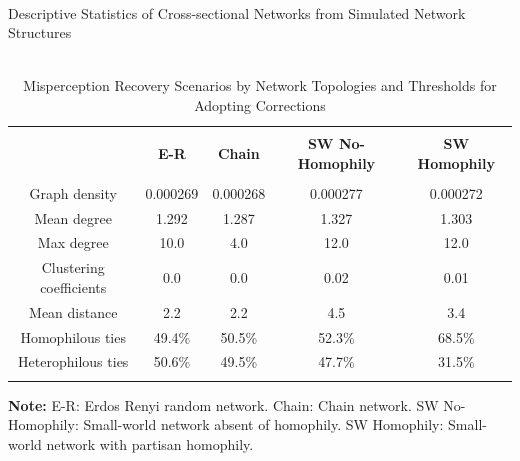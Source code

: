 \documentclass[man, 12pt, a4paper, nolmodern, noextraspace]{apa6}
\begin{document}
\begin{table}[!htbp] \centering 
	\begin{minipage}{\textwidth}
    \centering
  \caption{\\ Descriptive Statistics of Cross-sectional Networks from Simulated Network Structures} 
  \label{tab:Table1} 
\begin{tabular}{@{\extracolsep{5pt}} ccccc} 
\\[-1.8ex]\hline 
\hline \\[-1.8ex] 
 & \textbf{E-R} & \textbf{Chain} &  \textbf{SW No-Homophily} & \textbf{SW Homophily} \\ 
\hline \\[-1.8ex] 
Graph density & 0.000269 & 0.000268 & 0.000277 & 0.000272 \\ 
Mean degree & 1.292 & 1.287 & 1.327 & 1.303 \\ 
Max degree & 10.0 & 4.0 & 12.0 & 12.0 \\ 
Clustering coefficients & 0.0 & 0.0 & 0.02 & 0.01 \\ 
Mean distance & 2.2 & 2.2 & 4.5 & 3.4 \\ 
Homophilous ties & 49.4\% & 50.5\% & 52.3\% & 68.5\% \\ 
Heterophilous ties & 50.6\% & 49.5\% & 47.7\% & 31.5\% \\ 
\hline \\[-1.8ex]  
\end{tabular} 
\begin{tablenotes}
\small \vspace{0.15in}
\textbf{Note:} E-R: Erdos Renyi random network. Chain: Chain network. SW No-Homophily: Small-world network absent of homophily. SW Homophily: Small-world network with partisan homophily.\\ 
\end{tablenotes}
 	\end{minipage}
\bigbreak
\vspace{0.5in}
 	\begin{minipage}{\textwidth}
    \centering
\caption{\\ Misperception Recovery Scenarios by Network Topologies and Thresholds for Adopting Corrections} 
  \label{tab:Table2} 
  

\end{minipage}
\end{table}
\end{document}
